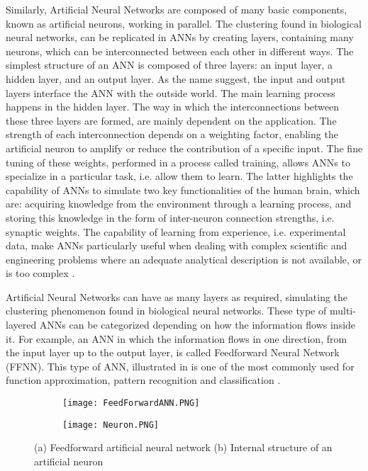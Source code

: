 Similarly, Artificial Neural Networks are composed of many basic components, known as artificial neurons, working in parallel. The clustering found in biological neural networks, can be replicated in ANNs by creating layers, containing many neurons, which can be interconnected between each other in different ways. The simplest structure of an ANN is composed of three layers: an input layer, a hidden layer, and an output layer. As the name suggest, the input and output layers interface the ANN with the outside world. The main learning process happens in the hidden layer. The way in which the interconnections between these three layers are formed, are mainly dependent on the application. The strength of each interconnection depends on a weighting factor, enabling the artificial neuron to amplify or reduce the contribution of a specific input. The fine tuning of these weights, performed in a process called training, allows ANNs to specialize in a particular task, i.e. allow them to learn. The latter highlights the capability of ANNs to simulate two key functionalities of the human brain, which are: acquiring knowledge from the environment through a learning process, and storing this knowledge in the form of inter-neuron connection strengths, i.e. synaptic weights. The capability of learning from experience, i.e. experimental data, make ANNs particularly useful when dealing with complex scientific and engineering problems where an adequate analytical description is not available, or is too complex  \cite{zhang2003artificial,trebar2007predicting}.

Artificial Neural Networks can have as many layers as required, simulating the clustering phenomenon found in biological neural networks. These type of multi-layered ANNs can be categorized depending on how the information flows inside it. For example, an ANN in which the information flows in one direction, from the input layer up to the output layer, is called Feedforward Neural Network (FFNN). This type of ANN, illustrated in  is one of the most commonly used for function approximation, pattern recognition and classification \cite{zhang2003artificial}.

\begin{figure}[htb!]
	\centering
    \begin{subfigure}[b]{0.49\textwidth}
        \centering
        \texttt{[image: FeedForwardANN.PNG]}
        \caption{}
        \label{fig:FFANN}
    \end{subfigure}
    \begin{subfigure}[b]{0.49\textwidth}
        \centering
        \texttt{[image: Neuron.PNG]}
        \caption{}
        \label{fig:neuron}
    \end{subfigure}
    \caption{(a) Feedforward artificial neural network (b) Internal structure of an artificial neuron \cite{rodriguez2019application}}
    \label{fig:neruonANN}
\end{figure}

